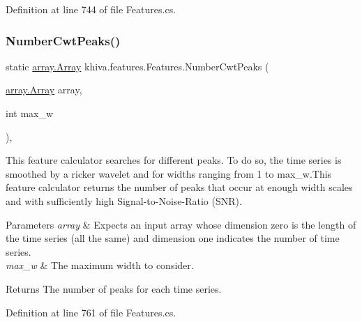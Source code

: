 Definition at line 744 of file Features.\+cs.

\mbox{\label{classkhiva_1_1features_1_1_features_a7fff71c6ba7f4ce4344e4395f506a35d}} 
\subsubsection{\texorpdfstring{Number\+Cwt\+Peaks()}{NumberCwtPeaks()}}
{\footnotesize\ttfamily static \mbox{\hyperlink{classkhiva_1_1array_1_1_array}{array.\+Array}} khiva.\+features.\+Features.\+Number\+Cwt\+Peaks (\begin{DoxyParamCaption}\item[{\mbox{\hyperlink{classkhiva_1_1array_1_1_array}{array.\+Array}}}]{array,  }\item[{int}]{max\+\_\+w }\end{DoxyParamCaption})\hspace{0.3cm}{\ttfamily [inline]}, {\ttfamily [static]}}



This feature calculator searches for different peaks. To do so, the time series is smoothed by a ricker wavelet and for widths ranging from 1 to max\+\_\+w.\+This feature calculator returns the number of peaks that occur at enough width scales and with sufficiently high Signal-\/to-\/\+Noise-\/\+Ratio (S\+NR). 


\begin{DoxyParams}{Parameters}
{\em array} & Expects an input array whose dimension zero is the length of the time series (all the same) and dimension one indicates the number of time series.\\
\hline
{\em max\+\_\+w} & The maximum width to consider.\\
\hline
\end{DoxyParams}
\begin{DoxyReturn}{Returns}
The number of peaks for each time series.
\end{DoxyReturn}


Definition at line 761 of file Features.\+cs.

\mbox{\label{classkhiva_1_1features_1_1_features_a4c4ac859a6d16dfafc5aa108b02b2c86}} 

